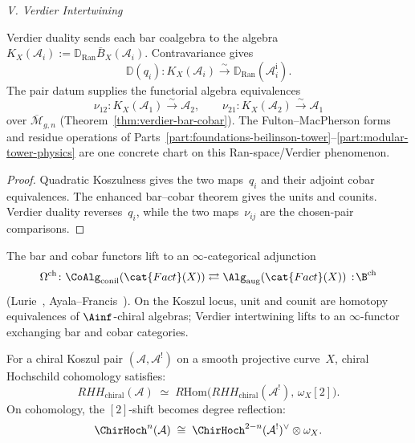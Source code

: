 \begin{theorem}
\medskip
\noindent\emph{V. Verdier Intertwining}

Verdier duality sends each bar coalgebra to the algebra
$K_X(\mathcal A_i):=\mathbb D_{\operatorname{Ran}}
\bar B_X(\mathcal A_i)$. Contravariance gives
\begin{equation}\label{eq:verdier-intertwining-main}
\mathbb D(q_i)\colon K_X(\mathcal A_i)
\xrightarrow{\sim}\mathbb D_{\operatorname{Ran}}
(\mathcal A_i^{\mathrm i}).
\end{equation}
The pair datum supplies the functorial algebra equivalences
\[
\nu_{12}\colon K_X(\mathcal A_1)\xrightarrow{\sim}\mathcal A_2,
\qquad
\nu_{21}\colon K_X(\mathcal A_2)\xrightarrow{\sim}\mathcal A_1
\]
over $\overline{\mathcal{M}}_{g,n}$
\textup{(}Theorem~\textup{\ref{thm:verdier-bar-cobar})}.
The Fulton--MacPherson forms and residue operations of
Parts~\ref{part:foundations-beilinson-tower}--\ref{part:modular-tower-physics} are one concrete chart on this Ran-space\slash Verdier phenomenon.
\end{theorem}

\begin{proof}
Quadratic Koszulness gives the two maps~$q_i$ and their adjoint cobar
equivalences. The enhanced bar--cobar theorem gives the units and
counits. Verdier duality reverses~$q_i$, while the two maps~$\nu_{ij}$
are the chosen-pair comparisons.
\end{proof}

\begin{remark}\label{rem:homotopy-native-a}
The bar and cobar functors lift to an $\infty$-categorical adjunction
\[
\Omega^{\mathrm{ch}} \colon
 \CoAlg_{\mathrm{conil}}(\cat{Fact}(X))
 \rightleftarrows
 \Alg_{\mathrm{aug}}(\cat{Fact}(X))
 \,:\!\B^{\mathrm{ch}}
\]
(Lurie~\cite[Chapter~5]{HA}, Ayala--Francis~\cite{AF15}).
On the Koszul locus, unit and counit are homotopy equivalences of
$\Ainf$-chiral algebras; Verdier intertwining lifts to an
$\infty$-functor exchanging bar and cobar categories.
\end{remark}

\begin{corollary}
\label{cor:hochschild-duality}
\label{cor:chiral-hochschild-duality}
For a chiral Koszul pair $(\mathcal{A}, \mathcal{A}^!)$ on a smooth projective curve~$X$,
chiral Hochschild cohomology satisfies:
\begin{equation}\label{eq:hochschild-duality-canonical}
RHH_{\mathrm{chiral}}(\mathcal{A})
\;\simeq\;
R\mathrm{Hom}\bigl(RHH_{\mathrm{chiral}}(\mathcal{A}^!),\,
\omega_X[2]\bigr).
\end{equation}
On cohomology, the $[2]$-shift becomes degree reflection:
\begin{equation}\label{eq:hochschild-duality-groups}
\ChirHoch^n(\mathcal{A})
\;\cong\; \ChirHoch^{2-n}(\mathcal{A}^!)^{\vee}
\otimes \omega_X.
\end{equation}
\end{corollary}

